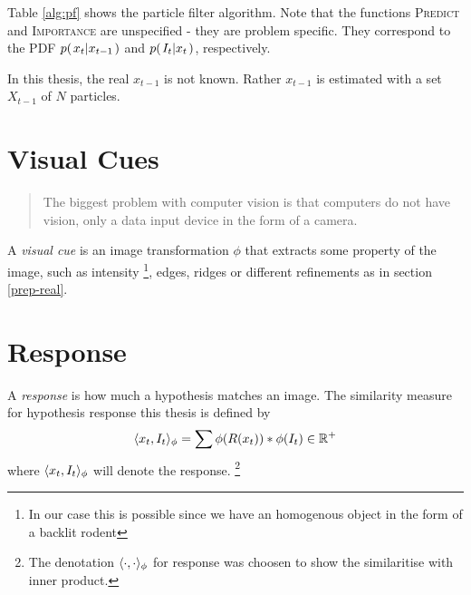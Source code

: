 Table \ref{alg:pf} shows the particle filter algorithm. Note that the
functions \textsc{Predict} and \textsc{Importance} are unspecified -
they are problem specific. They correspond to the PDF $p{(\left. x_t \middle\vert x_{t-1} \right.)}$
and $p{(\left. I_t \middle\vert x_t \right.)}$, respectively.


In this thesis, the real $x_{t-1}$ is not known. Rather $x_{t-1}$ is
estimated with a set $X_{t-1}$ of $N$ particles.

\section{Visual Cues}
\begin{quote}
    The biggest problem with computer vision is that computers do not have
    vision, only a data input device in the form of a camera.
\end{quote}
A \emph{visual cue} is an image transformation $\phi$ that extracts
some property of the image, such as intensity
\footnote{In our case this is possible since we have an homogenous object
in the form of a backlit rodent}, edges, ridges\cite{Hedvig} or different 
refinements as in section \ref{prep-real}.

\section{Response}

\begin{definition}
    A \emph{response} is how much a hypothesis matches an image. The similarity measure for hypothesis response this thesis is defined by
    \begin{equation}
        \label{eq:response}
        \langle x_t, I_t\rangle_{\phi} = \sum{\phi(R(x_t))*\phi(I_t)} \in \mathbb{R}^+
    \end{equation}
    where $\langle x_t, I_t\rangle_{\phi}$ will denote the response. \footnote{The denotation $\langle \cdot, \cdot\rangle_{\phi}$ for response was choosen to show the similaritise with inner product.}

\end{definition}

